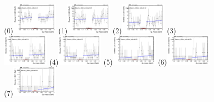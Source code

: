 \begin{figure}[h!]
        \centering
        \subfigure(0){\includegraphics[width=0.2\textwidth]{power_law/plots/taumu/massfit_taumu_40bins_bdtcut0.0.png}}
        \subfigure(1){\includegraphics[width=0.2\textwidth]{power_law/plots/taumu/massfit_taumu_40bins_bdtcut0.06.png}}
        \subfigure(2){\includegraphics[width=0.2\textwidth]{power_law/plots/taumu/massfit_taumu_40bins_bdtcut0.12.png}}
        \subfigure(3){\includegraphics[width=0.2\textwidth]{power_law/plots/taumu/massfit_taumu_40bins_bdtcut0.18.png}}
        \subfigure(4){\includegraphics[width=0.2\textwidth]{power_law/plots/taumu/massfit_taumu_40bins_bdtcut0.2.png}}
        \subfigure(5){\includegraphics[width=0.2\textwidth]{power_law/plots/taumu/massfit_taumu_40bins_bdtcut0.24.png}}
        \subfigure(6){\includegraphics[width=0.2\textwidth]{power_law/plots/taumu/massfit_taumu_40bins_bdtcut0.28.png}}
        \subfigure(7){\includegraphics[width=0.2\textwidth]{power_law/plots/taumu/massfit_taumu_40bins_bdtcut0.32.png}}

\end{figure}
